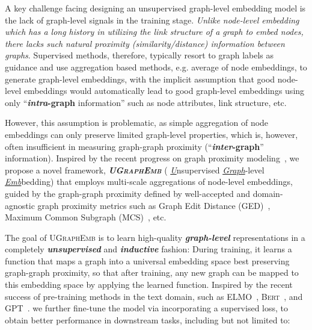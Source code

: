 \documentclass{article}
\newcommand{\model}{\textsc{UGraphEmb}\xspace}
\begin{document}
A key challenge facing designing an unsupervised graph-level embedding model is the lack of graph-level signals in the training stage. \textit{Unlike node-level embedding which has a long history in utilizing the link structure of a graph to embed nodes, there lacks such natural proximity (similarity/distance) information between graphs}. Supervised methods, therefore, typically resort to graph labels as guidance and use aggregation based methods, e.g. average of node embeddings, to generate graph-level embeddings, with the implicit assumption that good node-level embeddings would automatically lead to good graph-level embeddings using only ``\textbf{\textit{intra}-graph} information'' such as node attributes, link structure, etc.

However, this assumption is problematic, as simple aggregation of node embeddings can only preserve limited graph-level properties, which is, however, often insufficient in measuring graph-graph proximity (``\textbf{\textit{inter}-graph}'' information).  
Inspired by the recent progress on graph proximity modeling~\cite{ktena2017distance,bai2018graph}, we propose a novel framework, \emph{\textbf{\model}} ( \emph{\underline{U}}nsupervised \emph{\underline{Graph}}-level \emph{\underline{Emb}}bedding) that employs multi-scale aggregations of node-level embeddings, guided by the graph-graph proximity defined by well-accepted and domain-agnostic graph proximity metrics such as Graph Edit Distance (GED)~\cite{bunke1983distance}, Maximum Common Subgraph (MCS)~\cite{bunke1998graph}, etc.






The goal of \model is to learn high-quality \textit{\textbf{graph-level}} representations in a completely \textit{\textbf{unsupervised}} and \textit{\textbf{inductive}} fashion: During training, it learns a function that maps a graph into a universal embedding space best preserving graph-graph proximity, so that after training, any new graph can be mapped to this embedding space by applying the learned function. 
Inspired by the recent success of pre-training methods in the text domain, such as \textsc{ELMO}~\cite{peters2018deep}, \textsc{Bert}~\cite{devlin2018bert}, and \textsc{GPT}~\cite{radford2018improving}. we 
further fine-tune the model via incorporating a supervised loss, to obtain better performance in downstream tasks, including but not limited to:
\end{document}
